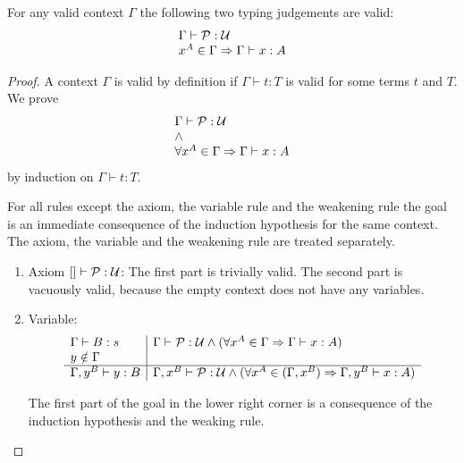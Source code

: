 \begin{theorem}
    \label{StartLemma}
    For any valid context $\Gamma$ the following two typing judgements are
    valid:
    $$
    \begin{array}{l}
        \Gamma \vdash {\cal P}: {\cal U}
        \\
        x^A \in \Gamma \Rightarrow \Gamma \vdash x :A
    \end{array}
    $$

    \begin{proof}
        A context $\Gamma$ is valid by definition if $\Gamma \vdash t: T$ is
        valid for some terms $t$ and $T$. We prove
        $$
        \begin{array}{l}
            \Gamma \vdash {\cal P} : {\cal U}
            \\
            \land
            \\
            \forall x^A \in \Gamma \Rightarrow \Gamma \vdash x: A
        \end{array}
        $$
        by induction on $\Gamma \vdash t : T$.

        For all rules except the axiom, the variable rule and the weakening rule
        the goal is an immediate consequence of the induction hypothesis for the
        same context.  The axiom, the variable and the weakening rule are
        treated separately.

        \begin{enumerate}
        \item Axiom $[] \vdash {\cal P}: {\cal U}$: The first part is trivially valid.
            The second part is vacuously valid, because the empty context does
                not have any variables.

        \item Variable:
            $$
            \begin{array}{l|l}
                \Gamma \vdash B: s
                &
                \Gamma \vdash {\cal P} : {\cal U}
                \land
                (\forall x^A \in \Gamma \Rightarrow \Gamma \vdash x : A)
                \\
                y \notin \Gamma
                \\
                \hline
                \Gamma, y^B \vdash y: B
                &
                \Gamma, x^B \vdash {\cal P}:{\cal U}
                \land
                (\forall x^A \in (\Gamma, x^B) \Rightarrow \Gamma, y^B \vdash x : A)
            \end{array}
            $$

            The first part of the goal in the lower right corner is a
                consequence of the induction hypothesis and the weaking rule.


\end{enumerate}
\end{proof}
\end{theorem}
